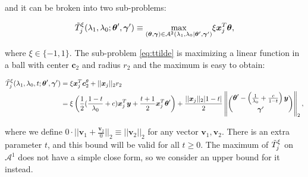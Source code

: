 and it can be broken into two sub-problems:

\begin{equation}
    \label{eq:ttilde}
    \Tilde{T}^\xi_j(\lambda_1,\lambda_0;\boldsymbol\theta',\boldsymbol\gamma')\equiv\underset{(\boldsymbol\theta,\boldsymbol\gamma)\in\mathcal{A}^2(\lambda_1,\lambda_0|\boldsymbol\theta',\boldsymbol\gamma')}{\mathrm{max}}\xi \boldsymbol x_j^T\boldsymbol\theta,
\end{equation}

where $\xi\in\{-1,1\}$. The sub-problem \eqref{eq:ttilde} is maximizing a linear function in a ball with center $\boldsymbol c_2$ and radius $r_2$ and the maximum is easy to obtain:

\begin{gather}
    \label{eq:ttildexi}
    \begin{aligned}
        \Tilde{T}^\xi_j(\lambda_1,\lambda_0,t;\boldsymbol\theta',\boldsymbol\gamma')&=\xi\boldsymbol x_j^T\boldsymbol c_2^\theta+||\boldsymbol x_j||_2r_2\\
        &=\xi\left( \frac{1}{2}(\frac{1-t}{\lambda_0}+c)\boldsymbol x_j^T\boldsymbol y+\frac{t+1}{2}\boldsymbol x_j^T\boldsymbol\theta'\right)+\frac{||\boldsymbol x_j||_2|1-t|}{2}\left\Vert\binom{\boldsymbol\theta'-\left(\frac{1}{\lambda_0}+\frac{c}{1-t}\right)\boldsymbol y}{\boldsymbol\gamma'}\right\Vert_2,\\
    \end{aligned}
\end{gather}

where we define $0\cdot||\boldsymbol v_1+\frac{\boldsymbol v_2}{0}||_2\equiv ||\boldsymbol v_2||_2$ for any vector $\boldsymbol v_1,\boldsymbol v_2$. There is an extra parameter $t$, and this bound will be valid for all $t\geq 0$. The maximum of $\Tilde{T}^\xi_j$ on $\mathcal{A}^1$ does not have a simple close form, so we consider an upper bound for it instead.


